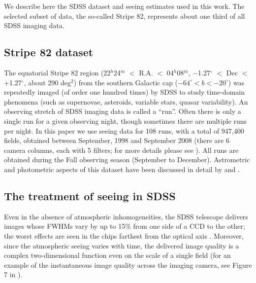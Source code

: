 

We describe here the SDSS dataset and seeing estimates used in this work. The
selected subset of data, the so-called Stripe 82, represents about one third of
all SDSS imaging data. 

\subsection{Stripe 82 dataset} 

The equatorial Stripe 82 region (22$^h$24$^m$ $<$ R.A. $<$ 04$^h$08$^m$, 
$-$1.27$^\circ$  $<$ Dec $<$ $+$1.27$^\circ$, about 
290 deg$^2$) from the southern Galactic cap ($-64^\circ < b <  -20^\circ$) was repeatedly imaged (of order
one hundred times) by SDSS to study time-domain phenomena (such as supernovae, asteroids, variable stars, quasar 
variability).  An observing stretch of SDSS imaging data is called a ``run''. Often there is only a single
run for a given observing night, though sometimes there are multiple
runs per night. In this paper we use seeing data for 
108 runs, with a total of 947,400 fields, obtained between September,
1998 and September 2008 (there are 6 camera columns, each with 5 filters; for more
details please see \citealt{Gunn2006}). All runs are obtained during the Fall observing season (September to 
December). Astrometric and photometric aspects of this dataset have been discussed in detail by 
\cite{Ivezic2007} and \cite{Sesar2007}. 


\subsection{The treatment of seeing in SDSS \label{sec:PSFdata}}
 
Even in the absence of atmospheric inhomogeneities, the SDSS telescope delivers images whose 
FWHMs vary by up to 15\% from one side of a CCD to the other; the worst effects are seen in 
the chips farthest from the optical axis \citep{Gunn2006}. Moreover, since the atmospheric 
seeing varies with time, the delivered image quality is a complex two-dimensional function 
even on the scale of a single field (for an example of the instantaneous image quality across 
the imaging camera, see Figure 7 in \citealt{SDSSEDR}). 
 
